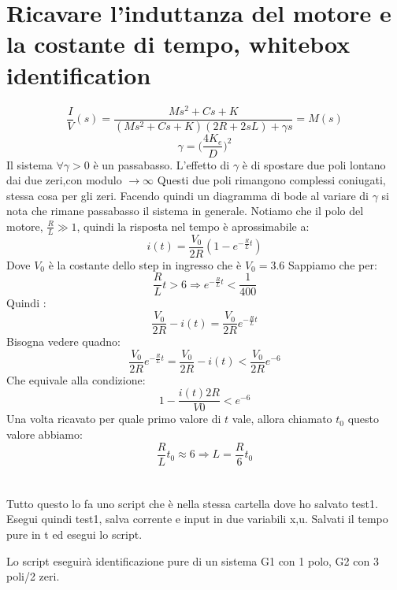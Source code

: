\documentclass[10pt,a4paper]{article}
\begin{document}
\section{Ricavare l'induttanza del motore e la costante di tempo, whitebox identification}
$$\frac{I}{V}(s) = \frac{Ms^2+Cs+K}{(Ms^2+Cs+K)(2R+2sL)+\gamma s } =M(s)$$
$$\gamma = \Big(\frac{4K_e}{D}\Big)^2$$
Il sistema $\forall \gamma > 0$ è un passabasso. L'effetto di $\gamma$ è di spostare due poli lontano dai due zeri,con modulo $\to \infty$ Questi due poli rimangono complessi coniugati, stessa cosa per gli zeri. Facendo quindi un diagramma di bode al variare di $\gamma$ si nota che rimane passabasso il sistema in generale. Notiamo che il polo del motore, $\frac{R}{L} \gg 1$, quindi la risposta nel tempo è aprossimabile a:
$$i(t) = \frac{V_0}{2R}(1-e^{-\frac{R}{L}t})$$
Dove $V_0$ è la costante dello step in ingresso che è $V_0=3.6$
Sappiamo che per:
$$\frac{R}{L}t > 6 \Rightarrow e^{-\frac{R}{L}t} < \frac{1}{400}$$
Quindi :
$$\frac{V_0}{2R} - i(t) = \frac{V_0}{2R}e^{-\frac{R}{L}t}$$
Bisogna vedere quadno:
$$\frac{V_0}{2R}e^{-\frac{R}{L}t}= \frac{V_0}{2R} - i(t) < \frac{V_0}{2R}e^{-6}$$
Che equivale alla condizione:
$$1- \frac{i(t)2R}{V0} < e^{-6}$$
Una volta ricavato per quale primo valore di $t$ vale, allora chiamato $t_0$ questo valore abbiamo:
$$\frac{R}{L}t_0 \approx 6 \Rightarrow L = \frac{R}{6}t_0$$\\ \\

Tutto questo lo fa uno script che è nella stessa cartella dove ho salvato test1. Esegui quindi test1, salva corrente e input in due variabili x,u. Salvati il tempo pure in t ed esegui lo script.

Lo script eseguirà identificazione pure di un sistema G1 con 1 polo, G2 con 3 poli/2 zeri.
\end{document}
